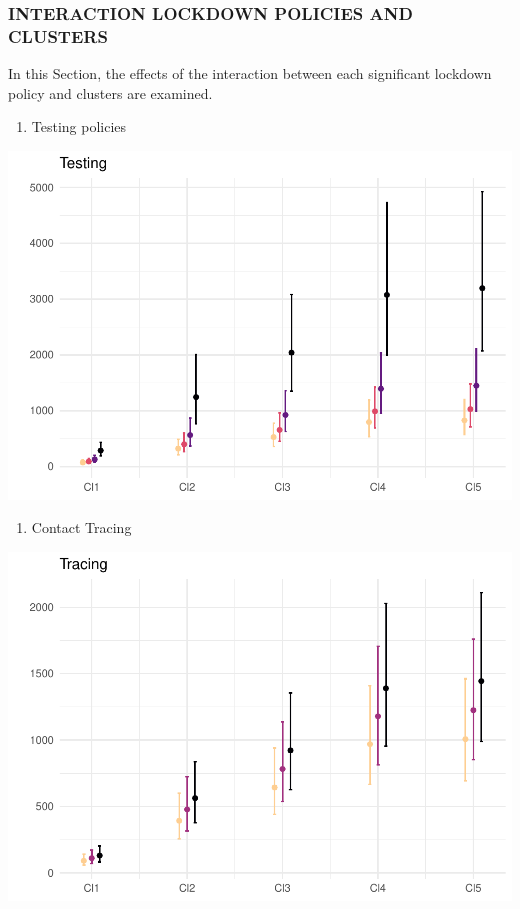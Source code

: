 \documentclass[
  6pt,
]{article}
\providecommand{\tightlist}{%
  \setlength{\itemsep}{0pt}\setlength{\parskip}{0pt}}
\begin{document}
\hypertarget{interaction-lockdown-policies-and-clusters}{%
\subsubsection{INTERACTION LOCKDOWN POLICIES AND
CLUSTERS}\label{interaction-lockdown-policies-and-clusters}}

In this Section, the effects of the interaction between each significant
lockdown policy and clusters are examined.

\begin{enumerate}
\def\labelenumi{\arabic{enumi}.}
\tightlist
\item
  Testing policies
\end{enumerate}
\begin{center}
\includegraphics[width=0.7\linewidth]{Report_SC_Group3_files/figure-latex/unnamed-chunk-23-1}
\end{center}
\begin{enumerate}
\def\labelenumi{\arabic{enumi}.}
\setcounter{enumi}{1}
\tightlist
\item
  Contact Tracing
\end{enumerate}
\begin{center}
\includegraphics[width=0.7\linewidth]{Report_SC_Group3_files/figure-latex/unnamed-chunk-24-1}
\end{center}
\end{document}
